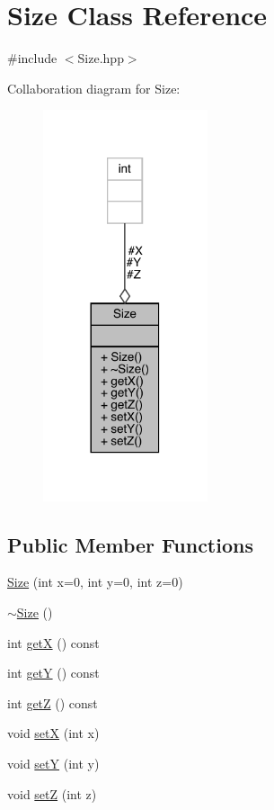 \hypertarget{class_size}{}\section{Size Class Reference}
\label{class_size}


{\ttfamily \#include $<$Size.\+hpp$>$}



Collaboration diagram for Size\+:\nopagebreak
\begin{figure}[H]
\begin{center}
\leavevmode
\includegraphics[width=137pt]{class_size__coll__graph}
\end{center}
\end{figure}
\subsection*{Public Member Functions}
\begin{DoxyCompactItemize}
\item 
\mbox{\hyperlink{class_size_a232d7081f3ca430ac09ceab05d1f1179}{Size}} (int x=0, int y=0, int z=0)
\item 
\mbox{\hyperlink{class_size_a0d82fe638fc5a83beee67e2cc91d284e}{$\sim$\+Size}} ()
\item 
int \mbox{\hyperlink{class_size_a09b31ec544a6d1e1901470998fa773d9}{getX}} () const
\item 
int \mbox{\hyperlink{class_size_a1ff10ace4300deb61e377f6f63d122e6}{getY}} () const
\item 
int \mbox{\hyperlink{class_size_a31f18cf9009c995895e75af2408abc0e}{getZ}} () const
\item 
void \mbox{\hyperlink{class_size_aaa5f33e1c4cba634e0252b66ce578229}{setX}} (int x)
\item 
void \mbox{\hyperlink{class_size_a78eef0d6971e5f7ef7fb5d017436a4ae}{setY}} (int y)
\item 
void \mbox{\hyperlink{class_size_a7df8db388f33ecde9a1219182bdada8e}{setZ}} (int z)
\end{DoxyCompactItemize}

